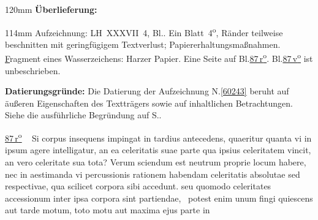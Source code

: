 %
\begin{ledgroupsized}[r]{120mm}%
\footnotesize%
\pstart%
\noindent\textbf{Überlieferung:}%
\pend%
\end{ledgroupsized}%
\begin{ledgroupsized}[r]{114mm}%
\footnotesize%
\pstart%
\parindent -6mm%
%
Aufzeichnung:
LH~XXXVII~4, Bl..
Ein Blatt~4\textsuperscript{o},
Ränder teilweise beschnitten mit geringfügigem Textverlust;
Papiererhaltungsmaßnahmen.
\href{\Scan{LH_37_04_087wz}}%
Fragment eines {Wasserzeichens}:
Harzer Papier.
Eine Seite auf Bl.\;\href{\Scan{LH_37_04_087r}}{87\,r\textsuperscript{o}}.
Bl.\;\href{\Scan{LH_37_04_087v}}{87\,v\textsuperscript{o}} ist unbeschrieben.
\pend%
\end{ledgroupsized}%
\vspace{5mm}%
\begin{ledgroup}%
\footnotesize%
\pstart%
\noindent%
\textbf{Datierungsgründe:}
Die Datierung der Aufzeichnung N.\;\ref{60243} beruht auf äußeren Eigenschaften des Text\-trägers %
sowie auf inhaltlichen Betrachtungen.
Siehe die ausführliche Begründung auf S.\;\pageref{60243_dat}.
\pend%
\end{ledgroup}%
%
\frenchspacing%
\vspace{8mm}%
\normalsize%
\pstart%
\noindent%
\lbrack%
\href{\Scan{LH_37_04_087r}}%
{87\,r\textsuperscript{o}}%
\rbrack\ %
Si corpus insequens%
impingat in tardius antecedens,%
quaeritur
quanta vi in ipsum agere%
intelligatur,
an ea celeritatis suae parte %
qua ipsius celeritatem vincit,
an vero celeritate sua tota?
Verum sciendum est
neutrum proprie locum habere,
nec in aestimanda vi percussionis%
rationem habendam celeritatis absolutae%
sed respectivae,%
qua scilicet corpora sibi accedunt.
seu quomodo celeritates accessionum%
%
inter ipsa corpora sint partiendae,%
\lbrack\textendash\rbrack\
potest enim unum fingi quiescens %
aut tarde motum,
toto motu aut maxima ejus parte in
